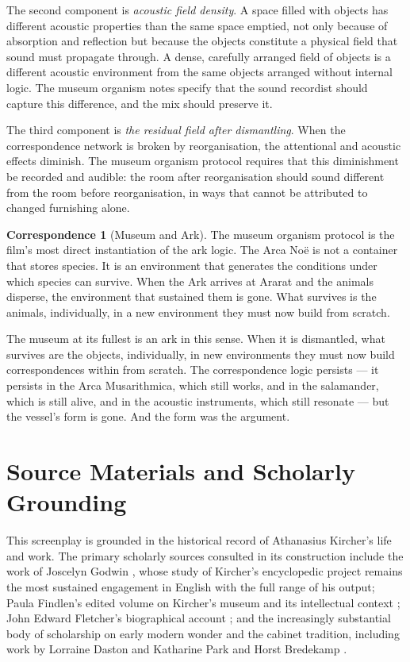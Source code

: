 \documentclass[12pt, a4paper, twoside]{memoir}
\theoremstyle{definition}
\newtheorem{correspondence}{Correspondence}[chapter]
\theoremstyle{remark}
\begin{document}
The second component is \textit{acoustic field density}. A space filled with objects has different acoustic properties than the same space emptied, not only because of absorption and reflection but because the objects constitute a physical field that sound must propagate through. A dense, carefully arranged field of objects is a different acoustic environment from the same objects arranged without internal logic. The museum organism notes specify that the sound recordist should capture this difference, and the mix should preserve it.

The third component is \textit{the residual field after dismantling}. When the correspondence network is broken by reorganisation, the attentional and acoustic effects diminish. The museum organism protocol requires that this diminishment be recorded and audible: the room after reorganisation should sound different from the room before reorganisation, in ways that cannot be attributed to changed furnishing alone.

\begin{correspondence}[Museum and Ark]
The museum organism protocol is the film's most direct instantiation of the ark logic. The Arca No\"e is not a container that stores species. It is an environment that generates the conditions under which species can survive. When the Ark arrives at Ararat and the animals disperse, the environment that sustained them is gone. What survives is the animals, individually, in a new environment they must now build from scratch.

The museum at its fullest is an ark in this sense. When it is dismantled, what survives are the objects, individually, in new environments they must now build correspondences within from scratch. The correspondence logic persists --- it persists in the Arca Musarithmica, which still works, and in the salamander, which is still alive, and in the acoustic instruments, which still resonate --- but the vessel's form is gone. And the form was the argument.
\end{correspondence}

\chapter{Source Materials and Scholarly Grounding}

This screenplay is grounded in the historical record of Athanasius Kircher's life and work. The primary scholarly sources consulted in its construction include the work of Joscelyn Godwin \cite{godwin2009}, whose study of Kircher's encyclopedic project remains the most sustained engagement in English with the full range of his output; Paula Findlen's edited volume on Kircher's museum and its intellectual context \cite{findlen2004}; John Edward Fletcher's biographical account \cite{fletcher2011}; and the increasingly substantial body of scholarship on early modern wonder and the cabinet tradition, including work by Lorraine Daston and Katharine Park \cite{daston1998} and Horst Bredekamp \cite{bredekamp1995}.
\end{document}
